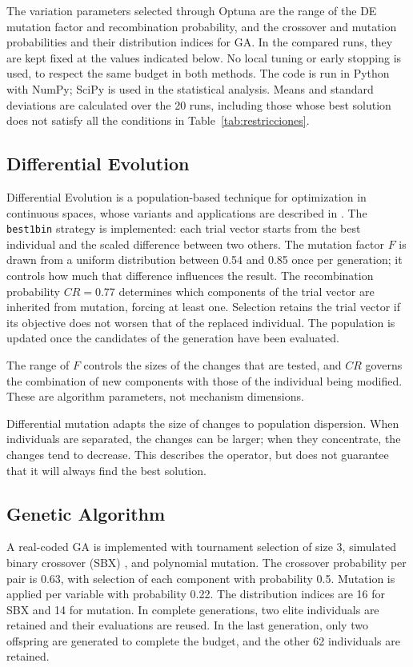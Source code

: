 \documentclass[conference,letterpaper]{IEEEtran}
\begin{document}
The variation parameters selected through Optuna \cite{r13} are the range of the DE mutation factor and recombination probability, and the crossover and mutation probabilities and their distribution indices for GA. In the compared runs, they are kept fixed at the values indicated below. No local tuning or early stopping is used, to respect the same budget in both methods. The code is run in Python with NumPy; SciPy is used in the statistical analysis. Means and standard deviations are calculated over the 20 runs, including those whose best solution does not satisfy all the conditions in Table~\ref{tab:restricciones}.

\subsection{Differential Evolution}
Differential Evolution is a population-based technique for optimization in continuous spaces, whose variants and applications are described in \cite{r14,r15}. The \texttt{best1bin} strategy is implemented: each trial vector starts from the best individual and the scaled difference between two others. The mutation factor $F$ is drawn from a uniform distribution between 0.54 and 0.85 once per generation; it controls how much that difference influences the result. The recombination probability $CR=0.77$ determines which components of the trial vector are inherited from mutation, forcing at least one. Selection retains the trial vector if its objective does not worsen that of the replaced individual. The population is updated once the candidates of the generation have been evaluated.

The range of $F$ controls the sizes of the changes that are tested, and $CR$ governs the combination of new components with those of the individual being modified. These are algorithm parameters, not mechanism dimensions.

Differential mutation adapts the size of changes to population dispersion. When individuals are separated, the changes can be larger; when they concentrate, the changes tend to decrease. This describes the operator, but does not guarantee that it will always find the best solution.

\subsection{Genetic Algorithm}
A real-coded GA is implemented with tournament selection of size 3, simulated binary crossover (SBX) \cite{r16}, and polynomial mutation. The crossover probability per pair is 0.63, with selection of each component with probability 0.5. Mutation is applied per variable with probability 0.22. The distribution indices are 16 for SBX and 14 for mutation. In complete generations, two elite individuals are retained and their evaluations are reused. In the last generation, only two offspring are generated to complete the budget, and the other 62 individuals are retained.
\end{document}
